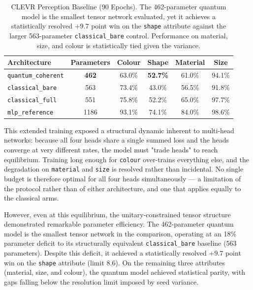 \documentclass[12pt, a4paper, oneside]{report}
\begin{document}
\begin{table}[hbt!]
    \centering
    \begin{tabular}{l c | c c c c}
        \toprule
        \textbf{Architecture} & \textbf{Parameters} & \textbf{Colour} & \textbf{Shape} & \textbf{Material} & \textbf{Size} \\
        \midrule
        \texttt{quantum\_coherent} & \textbf{462} & 63.0\% & \textbf{52.7\%} & 61.0\% & 94.1\% \\
        \midrule
        \texttt{classical\_bare} & 563 & 73.4\% & 43.0\% & 56.5\% & 91.8\% \\
        \texttt{classical\_full} & 551 & 75.8\% & 52.2\% & 65.0\% & 97.7\% \\
        \midrule
        \texttt{mlp\_reference} & 1186 & 93.1\% & 74.1\% & 84.0\% & 98.6\% \\
        \bottomrule
    \end{tabular}
    \caption{CLEVR Perception Baseline (90 Epochs). The 462-parameter quantum model is the smallest tensor network evaluated, yet it achieves a statistically resolved $+9.7$ point win on the \texttt{shape} attribute against the larger 563-parameter \texttt{classical\_bare} control. Performance on material, size, and colour is statistically tied given the variance.}
    \label{tab:perception_results}
\end{table}

This extended training exposed a structural dynamic inherent to multi-head networks: because all four heads share a single summed loss and the heads converge at very different rates, the model must "trade heads" to reach equilibrium. Training long enough for \texttt{colour} over-trains everything else, and the degradation on \texttt{material} and \texttt{size} is resolved rather than incidental. No single budget is therefore optimal for all four heads simultaneously --- a limitation of the protocol rather than of either architecture, and one that applies equally to the classical arms.

However, even at this equilibrium, the unitary-constrained tensor structure demonstrated remarkable parameter efficiency. The 462-parameter quantum model is the smallest tensor network in the comparison, operating at an 18\% parameter deficit to its structurally equivalent \texttt{classical\_bare} baseline (563 parameters). Despite this deficit, it achieved a statistically resolved $+9.7$ point win on the \texttt{shape} attribute (limit $8.6$). On the remaining three attributes (material, size, and colour), the quantum model achieved statistical parity, with gaps falling below the resolution limit imposed by seed variance.
\end{document}
